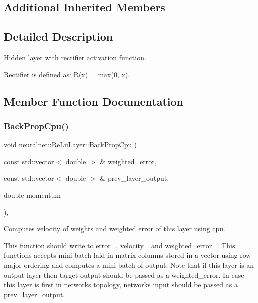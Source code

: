 \subsection*{Additional Inherited Members}


\subsection{Detailed Description}
Hidden layer with rectifier activation function. 

Rectifier is defined as\+: R(x) = max(0, x). 

\subsection{Member Function Documentation}
\mbox{\label{classneuralnet_1_1ReLuLayer_a41da88c3eace20c2d8d2c397a9feb9d8}} 
\subsubsection{\texorpdfstring{Back\+Prop\+Cpu()}{BackPropCpu()}}
{\footnotesize\ttfamily void neuralnet\+::\+Re\+Lu\+Layer\+::\+Back\+Prop\+Cpu (\begin{DoxyParamCaption}\item[{const std\+::vector$<$ double $>$ \&}]{weighted\+\_\+error,  }\item[{const std\+::vector$<$ double $>$ \&}]{prev\+\_\+layer\+\_\+output,  }\item[{double}]{momentum }\end{DoxyParamCaption})\hspace{0.3cm}{\ttfamily [protected]}, {\ttfamily [virtual]}}



Computes velocity of weights and weighted error of this layer using cpu. 

This function should write to error\+\_\+, velocity\+\_\+ and weighted\+\_\+error\+\_\+. This functions accepts mini-\/batch laid in matrix columns stored in a vector using row major ordering and computes a mini-\/batch of output. Note that if this layer is an output layer then target output should be passed as a weighted\+\_\+error. In case this layer is first in network\textquotesingle{}s topology, network\textquotesingle{}s input should be passed as a prev\+\_\+layer\+\_\+output.


